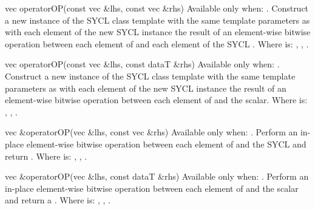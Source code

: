   \addRow
  {vec operatorOP(const vec \&lhs, const vec \&rhs)}
  {
    Available only when: .
    \newline
    Construct a new instance of the SYCL  class template with the same template parameters as   with each element of the new SYCL  instance the result of an element-wise  bitwise operation between each element of   and each element of the  SYCL .
    \newline \newline
    Where  is: \codeinline{\&}, \codeinline{\|}, \codeinline{\^}.
  }

  \addRow
  {vec operatorOP(const vec \&lhs, const dataT \&rhs)}
  {
    Available only when: .
    \newline
    Construct a new instance of the SYCL  class template with the same template parameters as   with each element of the new SYCL  instance the result of an element-wise  bitwise operation between each element of   and the  scalar.
    \newline \newline
    Where  is: \codeinline{\&}, \codeinline{\|}, \codeinline{\^}.
  }

  \addRow
  {vec \&operatorOP(vec \&lhs, const vec \&rhs)}
  {
    Available only when: .
    \newline
    Perform an in-place element-wise  bitwise operation between each element of   and the  SYCL  and return  .
    \newline \newline
    Where  is: \codeinline{\&=}, \codeinline{\|=}, \codeinline{\^=}.
  }

  \addRow
  {vec \&operatorOP(vec \&lhs, const dataT \&rhs)}
  {
    Available only when: .
    \newline
    Perform an in-place element-wise  bitwise operation between each element of   and the  scalar and return a  .
    \newline \newline
    Where  is: \codeinline{\&=}, \codeinline{\|=}, \codeinline{\^=}. 
  }

